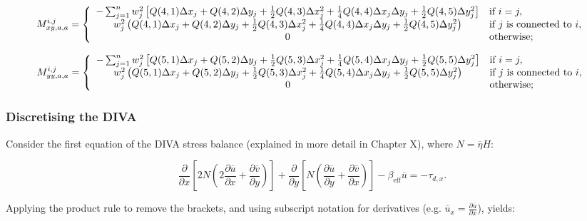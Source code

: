 \documentclass{article}
\begin{document}
\begin{equation}
M_{xy,a,a}^{i,j} = \left\{
\begin{array}{ c l }
-\sum_{j=1}^n w_j^2 \left[ Q(4,1) \Delta x_j + Q(4,2) \Delta y_j + \frac12 Q(4,3) \Delta x_j^2 + \frac14 Q(4,4) \Delta x_j \Delta y_j + \frac12 Q(4,5) \Delta y_j^2 \right] & \textrm{if } i = j, \\
w_j^2 \left( Q(4,1) \Delta x_j + Q(4,2) \Delta y_j + \frac12 Q(4,3) \Delta x_j^2 + \frac14 Q(4,4) \Delta x_j \Delta y_j + \frac12 Q(4,5) \Delta y_j^2 \right) & \textrm{if } j \textrm{ is connected to } i, \\
0 & \textrm{otherwise};
\end{array}
\right.
\end{equation}

\begin{equation}
M_{yy,a,a}^{i,j} = \left\{
\begin{array}{ c l }
-\sum_{j=1}^n w_j^2 \left[ Q(5,1) \Delta x_j + Q(5,2) \Delta y_j + \frac12 Q(5,3) \Delta x_j^2 + \frac14 Q(5,4) \Delta x_j \Delta y_j + \frac12 Q(5,5) \Delta y_j^2 \right] & \textrm{if } i = j, \\
w_j^2 \left( Q(5,1) \Delta x_j + Q(5,2) \Delta y_j + \frac12 Q(5,3) \Delta x_j^2 + \frac14 Q(5,4) \Delta x_j \Delta y_j + \frac12 Q(5,5) \Delta y_j^2 \right) & \textrm{if } j \textrm{ is connected to } i, \\
0 & \textrm{otherwise};
\end{array}
\right.
\end{equation}

\newpage
\subsubsection{Discretising the DIVA}

Consider the first equation of the DIVA stress balance (explained in more detail in Chapter X), where $N = \overline{\eta} H$:

\begin{equation} \label{eq:DIVA_discmesh_01}
\frac{\partial}{\partial x} \left[ 2 N \left( 2 \frac{\partial \overline{u}}{\partial x} + 
\frac{\partial \overline{v}}{\partial y} \right) \right] + 
\frac{\partial}{\partial y} \left[ N \left( \frac{\partial \overline{u}}{\partial y} + 
\frac{\partial \overline{v}}{\partial x} \right) \right] - \beta_{\textrm{eff}} \overline{u} = -\tau_{d,x}.
\end{equation}

Applying the product rule to remove the brackets, and using subscript notation for derivatives (e.g. $\overline{u}_x = \frac{\partial \overline{u}}{\partial x}$), yields:
\end{document}
